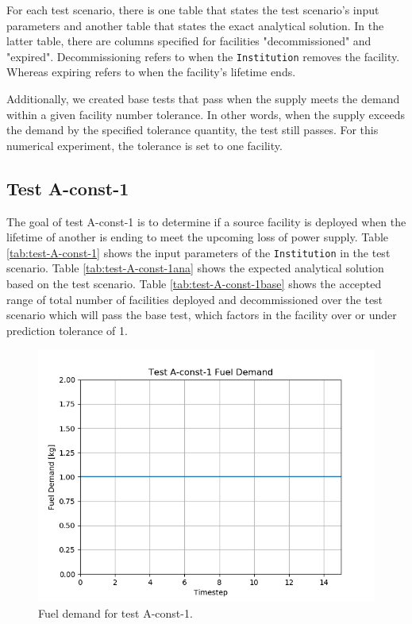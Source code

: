 \documentclass[11pt,letterpaper]{article}
\begin{document}
For each test scenario, there is one table that states the test scenario's input parameters and another table that states the exact analytical solution. In the latter table, there are columns specified for facilities "decommissioned" and "expired". Decommissioning refers to when the \texttt{Institution} removes the facility. Whereas expiring refers to when the facility's lifetime ends. 

Additionally, we created base tests that pass when the supply meets the demand within a given facility number tolerance.
In other words, when the supply exceeds the demand by the specified tolerance quantity, the test still passes. For this numerical experiment, the tolerance is set to one facility. 

\subsection{Test A-const-1}
The goal of test A-const-1 is to determine if a source facility is deployed when the lifetime of another is ending to meet the upcoming loss of power supply. 
Table \ref{tab:test-A-const-1} shows the input parameters of the \texttt{Institution} in the test scenario. Table \ref{tab:test-A-const-1ana} shows the expected analytical solution based on the test scenario. Table \ref{tab:test-A-const-1base} shows the accepted range of total number of facilities deployed and decommissioned over the test scenario which will pass the base test, which factors in the facility over or under prediction tolerance of 1.

\begin{figure}[H]
	\begin{center}
		\includegraphics[scale=0.7]{./images/A-const-1.png}
	\end{center}
        \caption{Fuel demand for test A-const-1.}
	\label{fig:A-const-1}
\end{figure}
\end{document}
